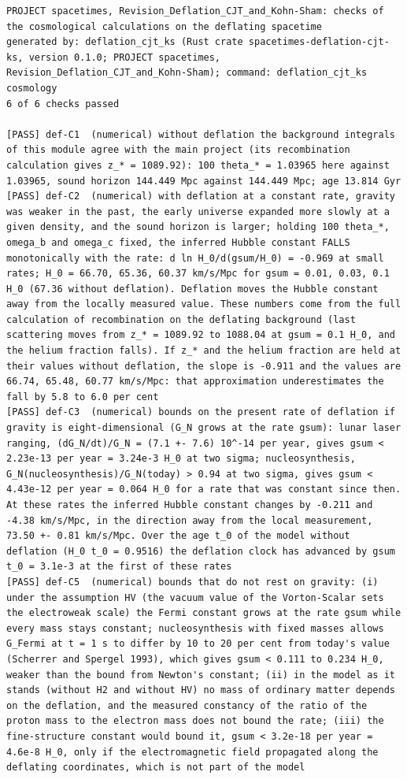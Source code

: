 \documentclass[
  10pt,
]{article}
\begin{document}
\begin{verbatim}
PROJECT spacetimes, Revision_Deflation_CJT_and_Kohn-Sham: checks of the cosmological calculations on the deflating spacetime
generated by: deflation_cjt_ks (Rust crate spacetimes-deflation-cjt-ks, version 0.1.0; PROJECT spacetimes, Revision_Deflation_CJT_and_Kohn-Sham); command: deflation_cjt_ks cosmology
6 of 6 checks passed

[PASS] def-C1  (numerical) without deflation the background integrals of this module agree with the main project (its recombination calculation gives z_* = 1089.92): 100 theta_* = 1.03965 here against 1.03965, sound horizon 144.449 Mpc against 144.449 Mpc; age 13.814 Gyr
[PASS] def-C2  (numerical) with deflation at a constant rate, gravity was weaker in the past, the early universe expanded more slowly at a given density, and the sound horizon is larger; holding 100 theta_*, omega_b and omega_c fixed, the inferred Hubble constant FALLS monotonically with the rate: d ln H_0/d(gsum/H_0) = -0.969 at small rates; H_0 = 66.70, 65.36, 60.37 km/s/Mpc for gsum = 0.01, 0.03, 0.1 H_0 (67.36 without deflation). Deflation moves the Hubble constant away from the locally measured value. These numbers come from the full calculation of recombination on the deflating background (last scattering moves from z_* = 1089.92 to 1088.04 at gsum = 0.1 H_0, and the helium fraction falls). If z_* and the helium fraction are held at their values without deflation, the slope is -0.911 and the values are 66.74, 65.48, 60.77 km/s/Mpc: that approximation underestimates the fall by 5.8 to 6.0 per cent
[PASS] def-C3  (numerical) bounds on the present rate of deflation if gravity is eight-dimensional (G_N grows at the rate gsum): lunar laser ranging, (dG_N/dt)/G_N = (7.1 +- 7.6) 10^-14 per year, gives gsum < 2.23e-13 per year = 3.24e-3 H_0 at two sigma; nucleosynthesis, G_N(nucleosynthesis)/G_N(today) > 0.94 at two sigma, gives gsum < 4.43e-12 per year = 0.064 H_0 for a rate that was constant since then. At these rates the inferred Hubble constant changes by -0.211 and -4.38 km/s/Mpc, in the direction away from the local measurement, 73.50 +- 0.81 km/s/Mpc. Over the age t_0 of the model without deflation (H_0 t_0 = 0.9516) the deflation clock has advanced by gsum t_0 = 3.1e-3 at the first of these rates
[PASS] def-C5  (numerical) bounds that do not rest on gravity: (i) under the assumption HV (the vacuum value of the Vorton-Scalar sets the electroweak scale) the Fermi constant grows at the rate gsum while every mass stays constant; nucleosynthesis with fixed masses allows G_Fermi at t = 1 s to differ by 10 to 20 per cent from today's value (Scherrer and Spergel 1993), which gives gsum < 0.111 to 0.234 H_0, weaker than the bound from Newton's constant; (ii) in the model as it stands (without H2 and without HV) no mass of ordinary matter depends on the deflation, and the measured constancy of the ratio of the proton mass to the electron mass does not bound the rate; (iii) the fine-structure constant would bound it, gsum < 3.2e-18 per year = 4.6e-8 H_0, only if the electromagnetic field propagated along the deflating coordinates, which is not part of the model

\end{verbatim}
\end{document}
